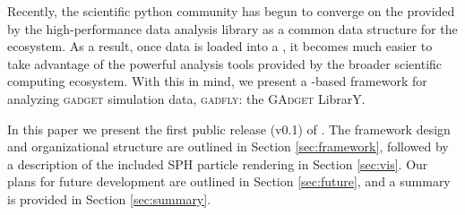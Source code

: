 Recently, the scientific python community has begun to converge on the  provided by the high-performance  data analysis library as a common data structure for the ecosystem. 
As a result, once data is loaded into a , it becomes much easier to take advantage of the powerful analysis tools provided by the broader scientific computing ecosystem.
With this in mind, we present a -based framework for analyzing \textsc{gadget} simulation data, \textsc{gadfly}: the \textsc{GAdget}  LibrarY.

In this paper we present the first public release (v0.1) of . 
The framework design and organizational structure are outlined in Section \ref{sec:framework}, followed by a description of the included SPH particle rendering  in Section \ref{sec:vis}.  Our plans for future development are outlined in Section \ref{sec:future}, and a summary is provided in Section \ref{sec:summary}.